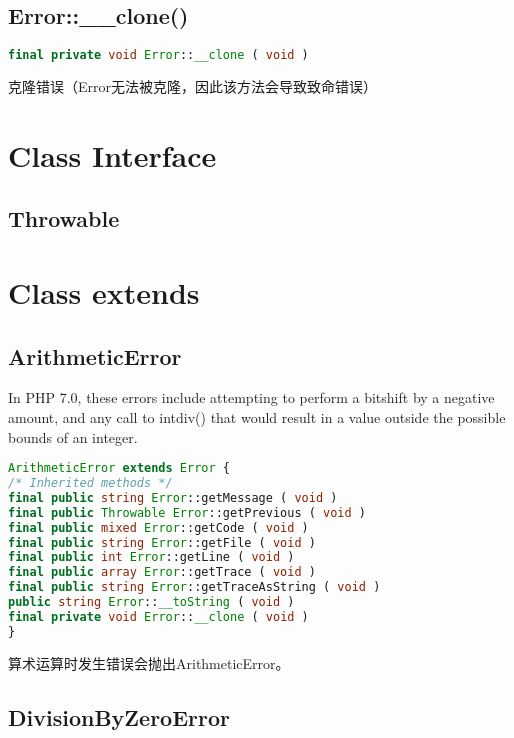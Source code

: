\subsection{Error::\_\_clone()}

\begin{lstlisting}[language=PHP]
final private void Error::__clone ( void )
\end{lstlisting}

克隆错误（Error无法被克隆，因此该方法会导致致命错误）


\section{Class Interface}


\subsection{Throwable}

\section{Class extends}


\subsection{ArithmeticError}

In PHP 7.0, these errors include attempting to perform a bitshift by a negative amount, and any call to intdiv() that would result in a value outside the possible bounds of an integer.

\begin{lstlisting}[language=PHP]
ArithmeticError extends Error {
/* Inherited methods */
final public string Error::getMessage ( void )
final public Throwable Error::getPrevious ( void )
final public mixed Error::getCode ( void )
final public string Error::getFile ( void )
final public int Error::getLine ( void )
final public array Error::getTrace ( void )
final public string Error::getTraceAsString ( void )
public string Error::__toString ( void )
final private void Error::__clone ( void )
}
\end{lstlisting}

算术运算时发生错误会抛出ArithmeticError。

\subsection{DivisionByZeroError}

